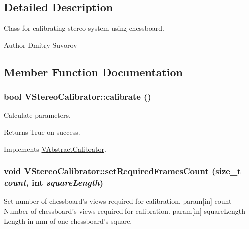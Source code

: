 \subsection{Detailed Description}
Class for calibrating stereo system using chessboard.

\begin{DoxyAuthor}{Author}
Dmitry Suvorov 
\end{DoxyAuthor}


\subsection{Member Function Documentation}
\hypertarget{classVStereoCalibrator_a7754bdddf997110220fedb2a222001ee}{
\subsubsection[{calibrate}]{\setlength{\rightskip}{0pt plus 5cm}bool VStereoCalibrator::calibrate ()}}
\label{classVStereoCalibrator_a7754bdddf997110220fedb2a222001ee}
Calculate parameters. \begin{DoxyReturn}{Returns}
True on success. 
\end{DoxyReturn}


Implements \hyperlink{classVAbstractCalibrator_a7251a0da257534695adcec223d467835}{VAbstractCalibrator}.

\hypertarget{classVStereoCalibrator_a48004bae492ead13c14f0810b74bc4d0}{
\subsubsection[{setRequiredFramesCount}]{\setlength{\rightskip}{0pt plus 5cm}void VStereoCalibrator::setRequiredFramesCount (size\_\-t {\em count}, \/  int {\em squareLength})}}
\label{classVStereoCalibrator_a48004bae492ead13c14f0810b74bc4d0}
Set number of chessboard's views required for calibration. param\mbox{[}in\mbox{]} count Number of chessboard's views required for calibration. param\mbox{[}in\mbox{]} squareLength Length in mm of one chessboard's square. 

